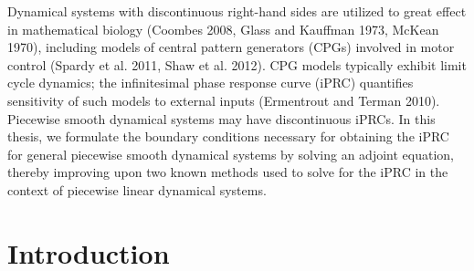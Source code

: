 \documentclass[12pt]{article}
\begin{document}
Dynamical systems with discontinuous right-hand sides are utilized to great effect in mathematical biology (Coombes 2008, Glass and Kauffman 1973, McKean 1970), including models of central pattern generators (CPGs) involved in motor control (Spardy et al. 2011, Shaw et al. 2012).  CPG models typically exhibit limit cycle dynamics; the infinitesimal phase response curve (iPRC) quantifies sensitivity of such models to external inputs (Ermentrout and Terman 2010).  Piecewise smooth dynamical systems may have discontinuous iPRCs.  In this thesis, we formulate the boundary conditions necessary for obtaining the iPRC for general piecewise smooth dynamical systems by solving an adjoint equation, thereby improving upon two known methods used to solve for the iPRC in the context of piecewise linear dynamical systems.
\newpage



\section{Introduction}
\end{document}
